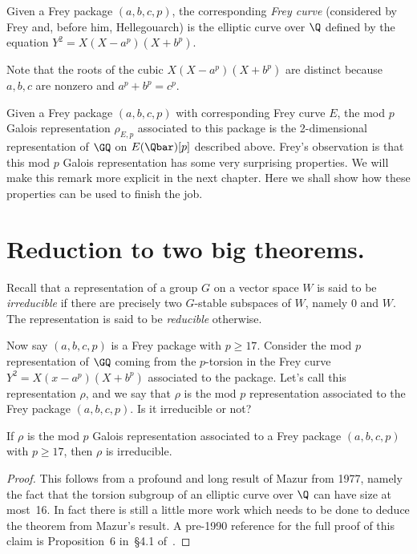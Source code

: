 \begin{definition}[Frey]
  \label{FreyCurve}
  \leanok
  Given a Frey package $(a,b,c,p)$, the corresponding \emph{Frey curve} (considered by Frey and,
  before him, Hellegouarch) is the elliptic curve over $\Q$ defined by the equation
  $Y^2=X(X-a^p)(X+b^p).$
\end{definition}

Note that the roots of the cubic $X(X-a^p)(X+b^p)$ are distinct because $a,b,c$ are nonzero and
$a^p+b^p=c^p$.

Given a Frey package $(a,b,c,p)$ with corresponding Frey curve $E$, the mod $p$ Galois
representation $\rho_{E,p}$ associated to this package is the 2-dimensional representation of
$\GQ$ on $E(\Qbar)[p]$ described above. Frey's observation is that this mod $p$ Galois
representation has some very surprising properties. We will make this remark more explicit
in the next chapter. Here we shall show how these properties can be used to finish the job.

\section{Reduction to two big theorems.}

Recall that a representation of a group $G$ on a vector space $W$ is said to be \emph{irreducible}
if there are precisely two $G$-stable subspaces of $W$, namely $0$ and $W$.
The representation is said to be \emph{reducible} otherwise.

Now say $(a,b,c,p)$ is a Frey package with $p\geq17$.
Consider the mod $p$ representation of $\GQ$ coming from the $p$-torsion in the Frey
curve $Y^2=X(x-a^p)(X+b^p)$ associated to the package. Let's call this representation $\rho$,
and we say that $\rho$ is the mod $p$ representation associated to the Frey package $(a,b,c,p)$.
Is it irreducible or not?

\begin{theorem}[Mazur]
  \label{Mazur_Frey}
  \leanok
  If $\rho$ is the mod $p$ Galois representation associated to a Frey package $(a,b,c,p)$
  with $p\geq17$, then
  $\rho$ is irreducible.
\end{theorem}
\begin{proof}
  \notready
  This follows from a profound and long result of Mazur \cite{mazur-torsion} from 1977,
  namely the fact that the torsion subgroup of an elliptic curve over $\Q$ can have size at most~16.
  In fact there is still a little more work which needs to be done to deduce the theorem from
  Mazur's result. A pre-1990 reference for the full proof of this claim is Proposition~6
  in~\S4.1 of~\cite{serreconj}.
\end{proof}

